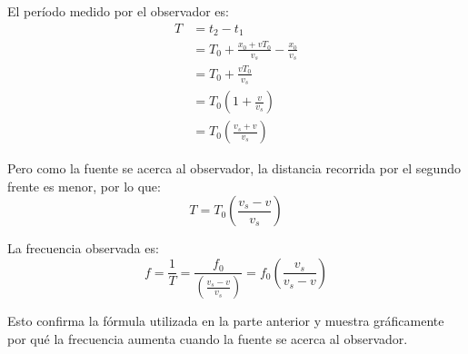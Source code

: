 \documentclass[
  11pt,
  letterpaper,
   addpoints,
   answers
  ]{exam}
\begin{document}
\begin{questions}
\begin{solution}
El período medido por el observador es:
\begin{align}
T &= t_2 - t_1 \\
&= T_0 + \frac{x_0 + vT_0}{v_s} - \frac{x_0}{v_s} \\
&= T_0 + \frac{vT_0}{v_s} \\
&= T_0\left(1 + \frac{v}{v_s}\right) \\
&= T_0\left(\frac{v_s + v}{v_s}\right)
\end{align}

Pero como la fuente se acerca al observador, la distancia recorrida por el segundo frente es menor, por lo que:
\begin{equation}
T = T_0\left(\frac{v_s - v}{v_s}\right)
\end{equation}

La frecuencia observada es:
\begin{equation}
f = \frac{1}{T} = \frac{f_0}{\left(\frac{v_s - v}{v_s}\right)} = f_0\left(\frac{v_s}{v_s - v}\right)
\end{equation}

Esto confirma la fórmula utilizada en la parte anterior y muestra gráficamente por qué la frecuencia aumenta cuando la fuente se acerca al observador.

\end{solution}
\end{questions}
\end{document}
